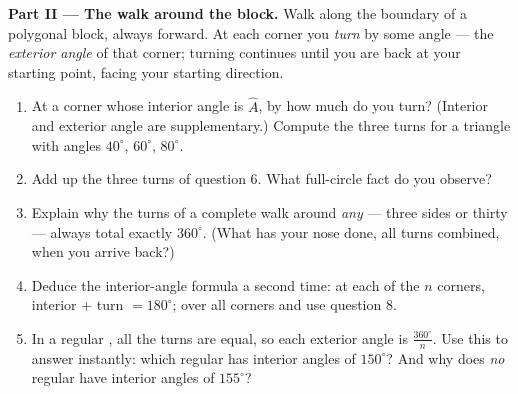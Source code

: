 \begin{problem}
\medskip
\noindent\textbf{Part II --- The walk around the block.}
Walk along the boundary of a polygonal block, always forward. At
each corner you \emph{turn} by some angle --- the \emph{exterior
angle} of that corner; turning continues until you are back at
your starting point, facing your starting direction.
\begin{enumerate}[resume]
  \item At a corner whose interior angle is $\widehat A$, by how
        much do you turn? (Interior and exterior angle are
        supplementary.) Compute
        the three turns for a triangle with angles $40^\circ$,
        $60^\circ$, $80^\circ$.
  \item Add up the three turns of question 6. What full-circle
        fact do you observe?
  \item Explain why the turns of a complete walk around
        \emph{any}  --- three sides or thirty --- always
        total exactly $360^\circ$. (What has your nose done, all
        turns combined, when you arrive back?)
  \item Deduce the interior-angle formula a second time: at each
        of the $n$ corners, interior $+$ turn $= 180^\circ$; 
        over all corners and use question 8.
  \item In a regular , all the turns are equal, so each
        exterior angle is $\frac{360^\circ}{n}$. Use this to
        answer instantly: which regular  has interior
        angles of $150^\circ$? And why does \emph{no} regular
         have interior angles of $155^\circ$?
\end{enumerate}


\end{problem}
